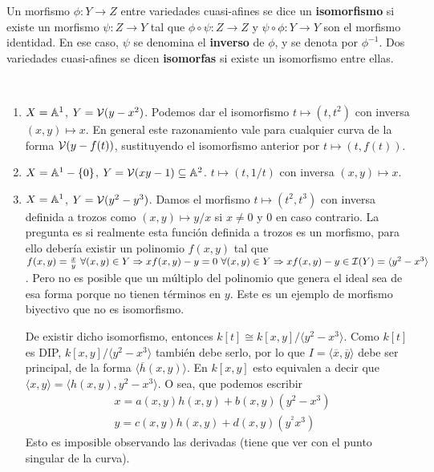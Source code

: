 \documentclass[ACGA.tex]{subfiles}
\begin{document}
\begin{defi} Un morfismo $\phi:Y\to Z$ entre variedades cuasi-afines se dice un {\bf isomorfismo} si existe un morfismo $\psi:Z\to Y$ tal que $\phi\circ \psi:Z\to Z$ y $\psi\circ \phi:Y\to Y$ son el morfismo identidad. En ese caso, $\psi$ se denomina el {\bf inverso} de $\phi$, y se denota por $\phi^{-1}$. Dos variedades cuasi-afines se dicen {\bf isomorfas} si existe un isomorfismo entre ellas.
 \end{defi}
 
\begin{ej}\
\begin{enumerate}
\item $X=\mathbb{A}^1$, $Y=\mathcal{V}(y-x^2)$. Podemos dar el isomorfismo $t\mapsto (t,t^2)$ con inversa $(x,y)\mapsto x$. En general este razonamiento vale para cualquier curva de la forma $\mathcal{V}(y-f(t))$, sustituyendo el isomorfismo anterior por $t\mapsto (t,f(t))$. 
\item $X=\mathbb{A}^1-\{0\}$, $Y=\mathcal{V}(xy-1)\subseteq\mathbb{A}^2$. $t\mapsto (t,1/t)$ con inversa $(x,y)\mapsto x$.
\item $X=\mathbb{A}^1$, $Y=\mathcal{V}(y^2-y^3)$. Damos el morfismo $t\mapsto(t^2,t^3)$ con inversa definida a trozos como $(x,y)\mapsto y/x$ si $x\neq 0$ y 0 en caso contrario. La pregunta es si realmente esta función definida a trozos es un morfismo, para ello debería existir un polinomio $f(x,y)$ tal que $f(x,y)=\frac{x}{y}\ \forall (x,y)\in Y\Rightarrow xf(x,y)-y=0\ \forall (x,y)\in Y\Rightarrow xf(x,y)-y\in\mathcal{I}(Y)=\langle y^2-x^3\rangle$. Pero no es posible que un múltiplo del polinomio que genera el ideal sea de esa forma porque no tienen términos en $y$. Este es un ejemplo de morfismo biyectivo que no es isomorfismo.

De existir dicho isomorfismo, entonces $k[t]\cong k[x,y]/\langle y^2-x^3\rangle$. Como $k[t]$ es DIP, $k[x,y]/\langle y^2-x^3\rangle$ también debe serlo, por lo que $I=\langle \overline{x},\overline{y}\rangle$ debe ser principal, de la forma $\langle \overline{h}(x,y)\rangle$. En $k[x,y]$ esto equivalen a decir que $\langle x,y\rangle=\langle h(x,y),y^2-x^3\rangle$. O sea, que podemos escribir 
\begin{align*}
&x=a(x,y)h(x,y)+b(x,y)(y^2-x^3)\\
&y=c(x,y)h(x,y)+d(x,y)(y^^2x^3)
\end{align*}
Esto es imposible observando las derivadas (tiene que ver con el punto singular de la curva).
\end{enumerate}
\end{ej}
\end{document}

